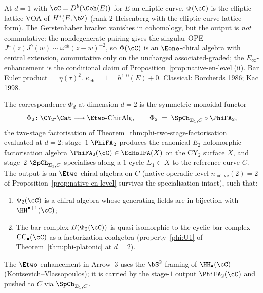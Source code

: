 \begin{corollary}[{\texorpdfstring{$\Phi.1$}{Phi.1}: \texorpdfstring{$d = 1$}{d = 1} evaluation; classical lattice-to-VOA}]
\label{cor:phi-d1-evaluation}
At $d = 1$ with $\cC = D^b(\Coh(E))$ for $E$ an elliptic curve, $\Phi(\cC)$ is the elliptic lattice VOA of $H^*(E, \bZ)$ \textup{(}rank-$2$ Heisenberg with the elliptic-curve lattice form\textup{).} The Gerstenhaber bracket vanishes in cohomology, but the output is \emph{not} commutative: the nondegenerate pairing gives the singular OPE $J^a(z)J^b(w) \sim \omega^{ab}(z-w)^{-2}$, so $\Phi(\cC)$ is an $\Eone$-chiral algebra with central extension, commutative only on the uncharged associated-graded; the $E_\infty$-enhancement is the conditional claim of Proposition~\ref{prop:native-en-level}\textup{(ii)}. Bar Euler product $= \eta(\tau)^2$. $\kappa_{\mathrm{ch}} = 1 = h^{1,0}(E) + 0$. Classical: Borcherds 1986; Kac 1998.
\end{corollary}

\begin{theorem}[{\texorpdfstring{$\Phi.2$}{Phi.2}: \texorpdfstring{$d = 2$}{d = 2} evaluation; CY-A\texorpdfstring{$_2$}{-2}}]
\label{thm:cy-to-chiral}
\label{thm:cy-a-d2}
The correspondence $\Phi_d$ at dimension $d = 2$ is the symmetric-monoidal functor
\[
 \Phi_2 \colon \CY_2\text{-}\Cat \longrightarrow \Etwo\text{-}\mathrm{ChirAlg},
 \qquad \Phi_2 \;=\; \SpCh_{\Sigma_1,C} \circ \PhiFA_2,
\]
the two-stage factorisation of Theorem~\ref{thm:phi-two-stage-factorisation} evaluated at $d = 2$: stage~$1$ $\PhiFA_2$ produces the canonical $E_2$-holomorphic factorisation algebra $\PhiFA_2(\cC) \in \EdHolFA(X)$ on the CY$_2$ surface $X$, and stage~$2$ $\SpCh_{\Sigma_1,C}$ specialises along a $1$-cycle $\Sigma_1 \subset X$ to the reference curve $C$. The output is an $\Etwo$-chiral algebra on $C$ (native operadic level $n_{\mathrm{native}}(2) = 2$ of Proposition~\ref{prop:native-en-level} survives the specialisation intact), such that:
\begin{enumerate}[label=(\roman*)]
 \item $\Phi_2(\cC)$ is a chiral algebra whose generating fields are in bijection with $\HH^{\bullet+1}(\cC)$;
 \item The bar complex $B(\Phi_2(\cC))$ is quasi-isomorphic to the cyclic bar complex $\mathrm{CC}_\bullet(\cC)$ as a factorization coalgebra \textup{(}property~\textup{\ref{phi:U1}} of Theorem~\textup{\ref{thm:phi-platonic}} at $d = 2$\textup{).}
\end{enumerate}
The $\Etwo$-enhancement in Arrow~3 uses the $\bS^2$-framing of $\HH_\bullet(\cC)$ (Kontsevich--Vlassopoulos); it is carried by the stage-$1$ output $\PhiFA_2(\cC)$ and pushed to $C$ via $\SpCh_{\Sigma_1,C}$.
\end{theorem}

